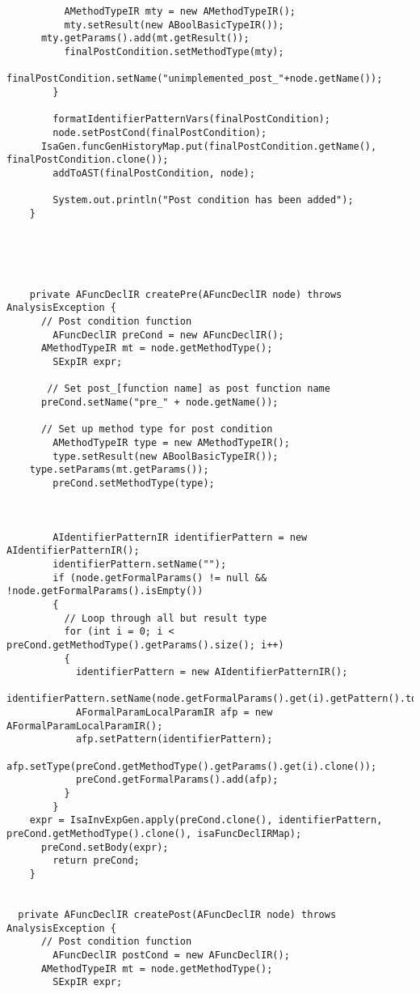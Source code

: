 \begin{appendices}
\begin{lstlisting}
          AMethodTypeIR mty = new AMethodTypeIR();
          mty.setResult(new ABoolBasicTypeIR());
      mty.getParams().add(mt.getResult());
          finalPostCondition.setMethodType(mty);
          finalPostCondition.setName("unimplemented_post_"+node.getName());
        }
      
        formatIdentifierPatternVars(finalPostCondition);
        node.setPostCond(finalPostCondition);
      IsaGen.funcGenHistoryMap.put(finalPostCondition.getName(), finalPostCondition.clone());
        addToAST(finalPostCondition, node);

        System.out.println("Post condition has been added");
    }
    
  
    


    private AFuncDeclIR createPre(AFuncDeclIR node) throws AnalysisException {
      // Post condition function
        AFuncDeclIR preCond = new AFuncDeclIR();
      AMethodTypeIR mt = node.getMethodType();
        SExpIR expr;
        
       // Set post_[function name] as post function name
      preCond.setName("pre_" + node.getName()); 
        
      // Set up method type for post condition
        AMethodTypeIR type = new AMethodTypeIR();
        type.setResult(new ABoolBasicTypeIR());
    type.setParams(mt.getParams());
        preCond.setMethodType(type);
        
        
        
        AIdentifierPatternIR identifierPattern = new AIdentifierPatternIR();
        identifierPattern.setName("");
        if (node.getFormalParams() != null && !node.getFormalParams().isEmpty())
        {
          // Loop through all but result type
          for (int i = 0; i < preCond.getMethodType().getParams().size(); i++)
          {
            identifierPattern = new AIdentifierPatternIR();
              identifierPattern.setName(node.getFormalParams().get(i).getPattern().toString());
            AFormalParamLocalParamIR afp = new AFormalParamLocalParamIR();
            afp.setPattern(identifierPattern);
            afp.setType(preCond.getMethodType().getParams().get(i).clone()); 
            preCond.getFormalParams().add(afp);
          }
        }
    expr = IsaInvExpGen.apply(preCond.clone(), identifierPattern, preCond.getMethodType().clone(), isaFuncDeclIRMap);
      preCond.setBody(expr);
        return preCond;
    }
    
    
  private AFuncDeclIR createPost(AFuncDeclIR node) throws AnalysisException {
      // Post condition function
        AFuncDeclIR postCond = new AFuncDeclIR();
      AMethodTypeIR mt = node.getMethodType();
        SExpIR expr;
        

\end{lstlisting}
\end{appendices}
